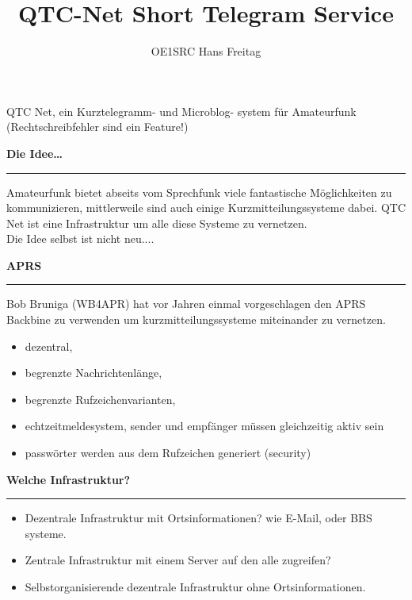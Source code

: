 \documentclass{seminar}
\title{QTC-Net Short Telegram Service}
\author{OE1SRC Hans Freitag }
\providecommand{\T}[1]{
	\begin{center}
		{\bf #1}
	\end{center}
	\vspace{2mm}
	\hrule
	\vspace{2mm}
}
\begin{document}
\pagestyle{empty}
\centerslidestrue
\begin{slide}
	\maketitle
	\begin{center}
		QTC Net, ein Kurztelegramm- und Microblog- system für Amateurfunk
		{\sf (Rechtschreibfehler sind ein Feature!)}
	\end{center}
\end{slide}
\centerslidesfalse

\pagestyle{mypagestyle}

\begin{slide}
	\T{Die Idee\ldots}
	Amateurfunk bietet abseits vom Sprechfunk viele fantastische Möglichkeiten zu kommunizieren, mittlerweile sind auch einige Kurzmitteilungssysteme dabei. QTC Net ist eine Infrastruktur um alle diese Systeme zu vernetzen. \\
 \pause
Die Idee selbst ist nicht neu.... 
\end{slide}

\begin{slide}
	\T{APRS}
	Bob Bruniga (WB4APR) hat vor Jahren einmal vorgeschlagen den APRS Backbine zu verwenden um kurzmitteilungssysteme miteinander zu vernetzen. \\ \pause
	\begin{itemize}
		\item dezentral, 
		\item begrenzte Nachrichtenlänge, 
		\item begrenzte Rufzeichenvarianten, 
		\item echtzeitmeldesystem, sender und empfänger müssen gleichzeitig aktiv sein
		\item passwörter werden aus dem Rufzeichen generiert (security)
	\end{itemize}
\end{slide}

\begin{slide}
	\T{Welche Infrastruktur?}
	\begin{itemize}
		\item Dezentrale Infrastruktur mit Ortsinformationen? wie E-Mail, oder BBS systeme.
		\item Zentrale Infrastruktur mit einem Server auf den alle zugreifen?
		\item Selbstorganisierende dezentrale Infrastruktur ohne Ortsinformationen.
	\end{itemize}
\end{slide}
\end{document}
